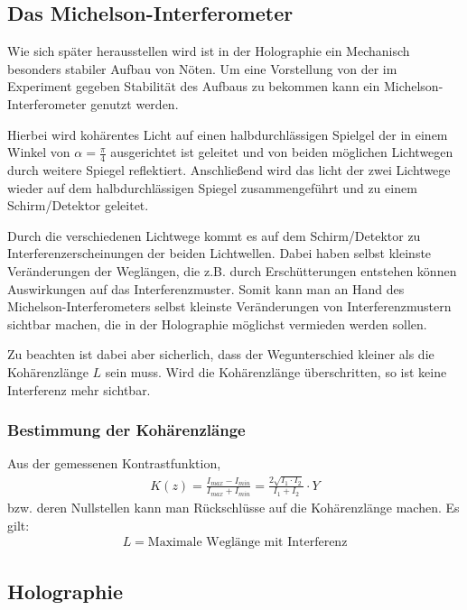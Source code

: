 \subsection{Das Michelson-Interferometer}
Wie sich später herausstellen wird ist in der Holographie ein Mechanisch besonders stabiler Aufbau von Nöten. Um eine Vorstellung von der im Experiment gegeben Stabilität des Aufbaus zu bekommen kann ein Michelson-Interferometer genutzt werden. 

Hierbei wird kohärentes Licht auf einen halbdurchlässigen Spielgel der in einem Winkel von $\alpha = \frac{\pi}{4}$ ausgerichtet ist geleitet und von beiden möglichen Lichtwegen durch weitere Spiegel reflektiert. Anschließend wird das licht der zwei Lichtwege wieder auf dem halbdurchlässigen Spiegel zusammengeführt und zu einem Schirm/Detektor geleitet.


Durch die verschiedenen Lichtwege kommt es auf dem Schirm/Detektor zu Interferenzerscheinungen der beiden Lichtwellen. Dabei haben selbst kleinste Veränderungen der Weglängen, die z.B. durch Erschütterungen entstehen können Auswirkungen auf das Interferenzmuster. Somit kann man an Hand des Michelson-Interferometers selbst kleinste Veränderungen von Interferenzmustern sichtbar machen, die in der Holographie möglichst vermieden werden sollen.

Zu beachten ist dabei aber sicherlich, dass der Wegunterschied kleiner als die Kohärenzlänge $L$ sein muss. Wird die Kohärenzlänge überschritten, so ist keine Interferenz mehr sichtbar.
\subsubsection{Bestimmung der Kohärenzlänge}
Aus der gemessenen Kontrastfunktion,
\begin{align}
K(z) = \frac{I_{max}-I_{min}}{I_{max}+I_{min}} = \frac{2\sqrt{I_1 \cdot I_2}}{I_1+I_2} \cdot Y
\end{align}
bzw. deren Nullstellen kann man Rückschlüsse auf die Kohärenzlänge machen. Es gilt:
\begin{align}
L = \text{Maximale Weglänge mit Interferenz}
\end{align}

\subsection{Holographie}

